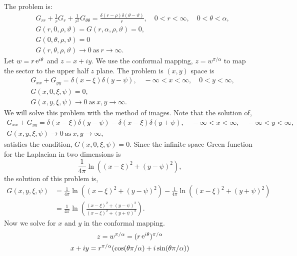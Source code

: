 {%
\begin{Solution}
  The problem is:
  \begin{align*}
    &G_{r r} + \frac{1}{r} G_r + \frac{1}{r^2} G_{\theta\theta} = 
    \frac{ \delta(r-\rho) \delta(\theta-\vartheta) }{ r }, 
    \quad 0 < r < \infty, \quad 0 < \theta < \alpha, \\
    &G(r,0,\rho,\vartheta) = G(r,\alpha,\rho,\vartheta) = 0, \\
    &G(0,\theta,\rho,\vartheta) = 0 \\
    &G(r,\theta,\rho,\vartheta) \to 0\ \mathrm{as}\ r \to \infty.
  \end{align*}
  Let $w = r \mathop{\mathrm{e}}\nolimits^{i \theta}$ and $z = x + i y$.  We use the conformal mapping,
  $z = w^{\pi/\alpha}$ to map the sector to the upper half $z$ plane.  The
  problem is $(x,y)$ space is
  \begin{align*}
    &G_{x x} + G_{y y} = \delta(x - \xi) \delta(y - \psi), 
    \quad -\infty < x < \infty, \quad 0 < y < \infty, \\
    &G(x,0,\xi,\psi) = 0, \\
    &G(x,y,\xi,\psi) \to 0\ \mathrm{as}\ x,y \to \infty.
  \end{align*}
  We will solve this problem with the method of images.  Note that the solution
  of,
  \begin{gather*}
    G_{x x} + G_{y y} = \delta(x-\xi) \delta(y-\psi) 
    - \delta(x-\xi) \delta(y+\psi), \quad - \infty < x < \infty,
    \quad - \infty < y < \infty, \\
    G(x,y,\xi,\psi) \to 0\ \mathrm{as}\ x,y \to \infty,
  \end{gather*}
  satisfies the condition, $G(x,0,\xi,\psi) = 0$.  Since the infinite space
  Green function for the Laplacian in two dimensions is
  \[
  \frac{1}{4\pi} \ln \left( (x-\xi)^2 + (y-\psi)^2 \right),
  \]
  the solution of this problem is,
  \begin{align*}
    G(x,y,\xi,\psi) &= 
    \frac{1}{4\pi} \ln \left( (x-\xi)^2 + (y-\psi)^2 \right)
    - \frac{1}{4\pi} \ln \left( (x-\xi)^2 + (y+\psi)^2 \right) \\
    &= \frac{1}{4\pi} \ln \left( \frac{ (x-\xi)^2 + (y-\psi)^2 }
      { (x-\xi)^2 + (y+\psi)^2 } \right).
  \end{align*}
  Now we solve for $x$ and $y$ in the conformal mapping.
  \begin{gather*}
    z = w^{\pi/\alpha} = (r \e^{i \theta})^{\pi/\alpha} \\
    x + i y = r^{\pi/\alpha} (\cos(\theta \pi/\alpha) + i\sin(\theta \pi/\alpha))\\

\end{gather*}
\end{Solution}}
